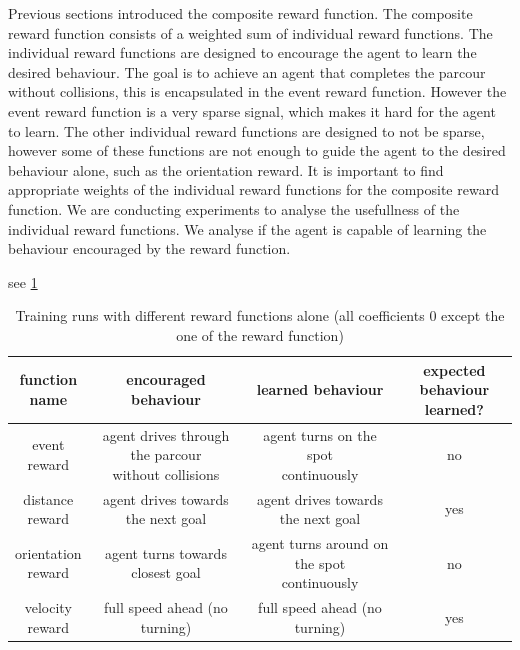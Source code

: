 Previous sections introduced the composite reward function. The composite reward function consists of a weighted sum of individual reward functions. The individual reward functions are designed to encourage the agent to learn the desired behaviour. The goal is to achieve an agent that completes the parcour without collisions, this is encapsulated in the event reward function. However the event reward function is a very sparse signal, which makes it hard for the agent to learn. The other individual reward functions are designed to not be sparse, however some of these functions are not enough to guide the agent to the desired behaviour alone, such as the orientation reward.
It is important to find appropriate weights of the individual reward functions for the composite reward function. We are conducting experiments to analyse the usefullness of the individual reward functions. We analyse if the agent is capable of learning the behaviour encouraged by the reward function.

see \ref{table:reward_functions_behaviour}


\begin{table}
    
\caption{Training runs with different reward functions alone (all coefficients 0 except the one of the reward function)}
\begin{center}
\begin{tabular}{|| c | c | c | c ||} 
    \hline
    \makecell{function \\ name} & encouraged behaviour & learned behaviour  & \makecell{expected behaviour \\ learned?} \\ [0.5ex] 
    \hline\hline
    \makecell{event \\ reward} &  \makecell{agent drives through the parcour \\ without collisions} & \makecell{agent turns on the spot \\ continuously} & no \\ 
    \hline
    \makecell{distance \\ reward} & agent drives towards the next goal & agent drives towards the next goal & yes \\
    \hline
    \makecell{orientation \\ reward} & agent turns towards closest goal & \makecell{agent turns around on the spot \\ continuously} & no \\
    \hline
    \makecell{velocity \\ reward}  & full speed ahead (no turning) & full speed ahead (no turning) & yes \\
    \hline
\end{tabular}
\end{center}
\label{table:reward_functions_behaviour}
\end{table}


